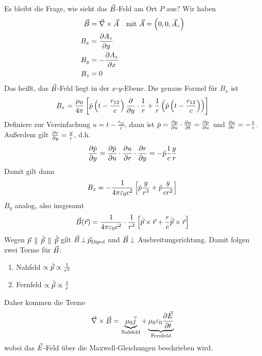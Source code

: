 Es bleibt die Frage, wie sieht das $\vecB$-Feld am Ort $P$ aus?
Wir haben
\begin{align*}
  \vecB &= \vecna\times\vecA 
  &\text{mit } \vecA = \left( 0,0,\vecA_z \right)\\
  B_x &= \dif[A_z]{y} \\
  B_y &= -\dif[A_z]{x}\\
  B_z &= 0
\end{align*}
Das heißt, das $\vecB$-Feld liegt in der $x$-$y$-Ebene.
Die genaue Formel für $B_x$ ist
\begin{gather*}
  B_x = \frac{\muo}{4\pi}\left[
    \dot{p}\left( t-\frac{r_{12}}{c} \right)\dif{y} \cdot \frac{1}{r}
    + \frac{1}{r}
    \left( 
      \dot{p}\left(t-\frac{r_{12}}{c}\right)
    \right)
  \right]
\end{gather*}
Definiere zur Vereinfachung $u=t-\frac{r_{12}}{c}$, dann ist
$\dot{p} = \dif[p]{u}\cdot\dif[u]{t} = \dif[p]{u}$
und $\dif[u]{r} = -\frac{1}{c}$.
Außerdem gilt $\dif[r]{y}=\frac{y}{r}$, d.h.
\begin{gather*}
  \dif[\dot{p}]{y} 
  = \dif[\dot{p}]{u}\cdot\dif[u]{r}\cdot\dif[r]{y}
  = -\ddot{p}\frac{1}{c}\frac{y}{r}
\end{gather*}
Damit gilt dann
\begin{gather*}
  B_x = -\frac{1}{4\pi\epso c^2}
  \left[ \dot{p}\frac{y}{r^3} 
    + \ddot{p} \frac{y}{cr^2} \right]
\end{gather*}
$B_y$ analog, also insgesamt
\begin{gather*}
  \vecB(\vecr) = \frac{1}{4\pi\epso c^2}\cdot
  \frac{1}{r^3}
  \left[ 
    \dot{\vecp}\times\vecr 
    + \frac{r}{c}\ddot{\vecp}\times\vecr
  \right]
\end{gather*}
Wegen $\vecp\,\parallel\,\dot{\vecp}\,\parallel\,\ddot{\vecp}$
gilt $\vecB\,\bot\,\vecp_{\text{Dipol}}$ und
$\vecB\,\bot$ Ausbreitungsrichtung.
Damit folgen zwei Terme für $\vecB$:
\begin{enumerate}
\item {Nahfeld} 
  $\propto \dot\vecp \propto \frac{1}{r^2}$
\item {Fernfeld} 
  $\propto \ddot\vecp \propto \frac{1}{r}$
\end{enumerate}
Daher kommen die Terme
\begin{gather*}
  \vecna \times \vecB 
  = \underbrace{\mu_0\vecj}_{\text{Nahfeld}}
  + \underbrace{\muo\epso \dif[\vecE]{t}}_{\text{Fernfeld}}
\end{gather*}
wobei das $\vecE$-Feld über die Maxwell-Gleichungen beschrieben wird.

